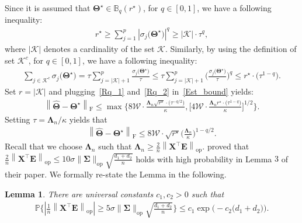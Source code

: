 \documentclass[12pt]{article}
\newtheorem{lemma}[theorem]{Lemma}
\begin{document}
Since it is assumed that $\boldsymbol{\Theta}^{\star}\in\mathbb{B}_{q}(r^{\star})$, for $q\in[0,1]$, we have a following inequality: 
\begin{align} \label{Rq_1}
    r^{\star} \geq \sum_{j=1}^{p} \left| \sigma_{j}\big(\boldsymbol{\Theta}^{\star} \big) \right|^{q} 
    \geq \left| \mathcal{K} \right| \cdot \tau^{q},
\end{align}
where $\left| \mathcal{K} \right|$ denotes a cardinality of the set $\mathcal{K}$.
Similarly, by using the definition of set $\mathcal{K}^{c}$, for $q\in[0,1]$, we have a following inequality:
\begin{align} \label{Rq_2}
    \sum_{j\in \mathcal{K}^{c}}\sigma_{j}\big(\boldsymbol{\Theta^{\star}}\big)
    = \tau \sum_{j = |\mathcal{K}|+1}^{p} \frac{\sigma_{j}\big(\boldsymbol{\Theta^{\star}}\big)}{\tau}
    \leq \tau \sum_{j = |\mathcal{K}|+1}^{p} \bigg(\frac{\sigma_{j}\big(\boldsymbol{\Theta^{\star}}\big)}{\tau}\bigg)^{q}
    \leq r^{\star} \cdot \big(\tau^{1-q}\big).
\end{align}
Set $r=|\mathcal{K}|$ and plugging~\eqref{Rq_1} and~\eqref{Rq_2} in~\eqref{Est_bound} yields:
\begin{align} \label{Est_bound_1}
    \left\| \widehat{\boldsymbol{\Theta}} - \boldsymbol{\Theta^{\star}} \right\|_{\text{F}}
    \leq \max\bigg\{ 8\mathcal{W} \cdot \frac{\boldsymbol{\Lambda}_{n}\sqrt{r^{\star}} \cdot \big(\tau^{-q/2}\big)}{\kappa}, 
    \bigg[  4 \mathcal{W} \cdot \frac{\boldsymbol{\Lambda}_{n}r^{\star} \cdot \big(\tau^{1-q}\big)}{\kappa}  \bigg]^{1/2}
    \bigg\}.
\end{align}
Setting $\tau=\boldsymbol{\Lambda}_{n}/\kappa$ yields that
\begin{align} \label{Est_bound_2}
    \left\| \widehat{\boldsymbol{\Theta}} - \boldsymbol{\Theta^{\star}} \right\|_{\text{F}}
    \leq 8\mathcal{W} \cdot \sqrt{r^{\star}} \bigg(\frac{\boldsymbol{\Lambda}_{n}}{\kappa}\bigg)^{1-q/2}.
\end{align}
Recall that we choose $\boldsymbol{\Lambda}_{n}$ such that  $\boldsymbol{\Lambda}_{n}\geq\frac{2}{n}\left\|\boldsymbol{X}^{\top}\boldsymbol{E} \right\|_{\text{op}}$.
\citet{negahban2011estimation} proved that $\frac{2}{n}\left\|\boldsymbol{X}^{\top}\boldsymbol{E} \right\|_{\text{op}}\leq 10 \sigma \|\boldsymbol{\Sigma}\|_{\text{op}} \sqrt{\frac{d_{1}+d_{2}}{n}} $ holds with high probability in Lemma $3$ of their paper.
We formally re-state the Lemma in the following.
\begin{lemma}
There are universal constants $c_{1},c_{2}>0$ such that
\begin{align*}
    \mathbb{P}\Bigg\{ \left|\frac{1}{n} \left\| \boldsymbol{X}^{\top}\boldsymbol{E} \right\|_{\text{op}} \right|
    \geq 5 \sigma \|\boldsymbol{\Sigma}\|_{\text{op}} \sqrt{\frac{d_{1}+d_{2}}{n}}  \Bigg\} \leq c_{1} \exp \Big( -c_{2} \big(d_{1}+d_{2}\big) \Big).
\end{align*}
\end{lemma}
\end{document}
